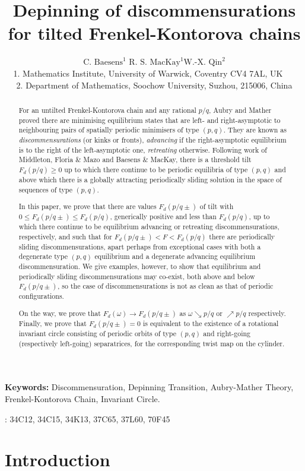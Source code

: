 \documentclass[12pt]{article}
\title{Depinning of discommensurations for tilted Frenkel-Kontorova chains}
\author{
{\small $\mbox{C. Baesens}^1$ \quad $\mbox{R. S. MacKay}^1$\quad $\mbox{W.-X. Qin}^2$
}
 \\
 {\small 1.  Mathematics Institute,  University of Warwick, Coventry CV4 7AL, UK\ \ \  }\\
{\small 2. Department of Mathematics, Soochow University, Suzhou, 215006,
 China}
}
\date{}                                         %
\newcounter{number}
\newcommand{\newsection}[1]{    \section{#1}
                               \setcounter{equation}{0}
                                \setcounter{number}{1} }
\begin{document}
\maketitle
\begin{abstract}
For an untilted Frenkel-Kontorova chain and any rational $p/q$, Aubry and Mather proved there are minimising equilibrium states that are left- and right-asymptotic to neighbouring pairs of spatially periodic minimisers of type $(p,q)$.  They are known as {\em discommensurations} (or kinks or fronts), {\em advancing }if the right-asymptotic equilibrium is to the right of the left-asymptotic one, {\em retreating} otherwise.  Following work of Middleton, Floria \& Mazo and Baesens \& MacKay, there is a threshold tilt $F_d(p/q)\ge 0$ up to which there continue to be periodic equilibria of type $(p,q)$ and above which there 
is a globally attracting periodically sliding solution in the space of sequences of type $(p,q)$.

In this paper, we prove that there are values $F_d(p/q\pm)$ of tilt with $0\le F_d(p/q\pm) \le F_d(p/q)$, generically positive and less than $F_d(p/q)$, up to which there continue to be equilibrium advancing or retreating discommensurations, respectively,
and such that for $F_d(p/q\pm) < F < F_d(p/q)$ there
are periodically sliding discommensurations, apart perhaps from exceptional cases with both a degenerate type $(p,q)$ equilibrium and a degenerate advancing equilibrium discommensuration.  We give examples, however, to show that equilibrium and periodically sliding discommensurations may co-exist, both above and below $F_d(p/q\pm)$,
so the case of discommensurations is not as clean as that of periodic configurations.


On the way, we prove that $F_d(\omega) \to F_d(p/q\pm)$ as $\omega \searrow p/q$ or $\nearrow p/q$ respectively.  Finally, we prove that $F_d(p/q\pm)=0$ is equivalent to the existence of a rotational invariant circle consisting of periodic orbits of type $(p,q)$ and right-going (respectively left-going) separatrices, for the corresponding twist map on the cylinder.
\end{abstract}

{\noindent \bf Keywords:}\hspace{0.5em}  Discommensuration,  Depinning Transition,  Aubry-Mather Theory, Frenkel-Kontorova Chain, Invariant Circle.


: 34C12, 34C15, 34K13, 37C65, 37L60, 70F45

\newsection{Introduction}\label{sec:int}
\end{document}
